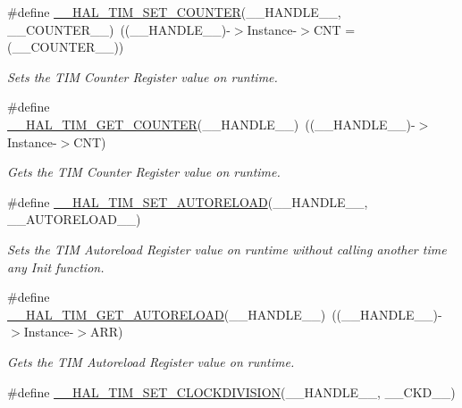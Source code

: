 \begin{DoxyCompactItemize}
\#define \hyperlink{group___t_i_m___exported___macros_ga9746ac75e4cd25cec1a9ebac8cb82b97}{\-\_\-\-\_\-\-H\-A\-L\-\_\-\-T\-I\-M\-\_\-\-S\-E\-T\-\_\-\-C\-O\-U\-N\-T\-E\-R}(\-\_\-\-\_\-\-H\-A\-N\-D\-L\-E\-\_\-\-\_\-, \-\_\-\-\_\-\-C\-O\-U\-N\-T\-E\-R\-\_\-\-\_\-)~((\-\_\-\-\_\-\-H\-A\-N\-D\-L\-E\-\_\-\-\_\-)-\/$>$Instance-\/$>$C\-N\-T = (\-\_\-\-\_\-\-C\-O\-U\-N\-T\-E\-R\-\_\-\-\_\-))
\begin{DoxyCompactList}\small\item\em Sets the T\-I\-M Counter Register value on runtime. \end{DoxyCompactList}\item 
\#define \hyperlink{group___t_i_m___exported___macros_gaf1af08014b9d06efbbb091d58d47c8ba}{\-\_\-\-\_\-\-H\-A\-L\-\_\-\-T\-I\-M\-\_\-\-G\-E\-T\-\_\-\-C\-O\-U\-N\-T\-E\-R}(\-\_\-\-\_\-\-H\-A\-N\-D\-L\-E\-\_\-\-\_\-)~((\-\_\-\-\_\-\-H\-A\-N\-D\-L\-E\-\_\-\-\_\-)-\/$>$Instance-\/$>$C\-N\-T)
\begin{DoxyCompactList}\small\item\em Gets the T\-I\-M Counter Register value on runtime. \end{DoxyCompactList}\item 
\#define \hyperlink{group___t_i_m___exported___macros_ga1e6300cab1e34ecaaf490dc7d4812d69}{\-\_\-\-\_\-\-H\-A\-L\-\_\-\-T\-I\-M\-\_\-\-S\-E\-T\-\_\-\-A\-U\-T\-O\-R\-E\-L\-O\-A\-D}(\-\_\-\-\_\-\-H\-A\-N\-D\-L\-E\-\_\-\-\_\-, \-\_\-\-\_\-\-A\-U\-T\-O\-R\-E\-L\-O\-A\-D\-\_\-\-\_\-)
\begin{DoxyCompactList}\small\item\em Sets the T\-I\-M Autoreload Register value on runtime without calling another time any Init function. \end{DoxyCompactList}\item 
\#define \hyperlink{group___t_i_m___exported___macros_gaa7a5c7645695bad15bacd402513a028a}{\-\_\-\-\_\-\-H\-A\-L\-\_\-\-T\-I\-M\-\_\-\-G\-E\-T\-\_\-\-A\-U\-T\-O\-R\-E\-L\-O\-A\-D}(\-\_\-\-\_\-\-H\-A\-N\-D\-L\-E\-\_\-\-\_\-)~((\-\_\-\-\_\-\-H\-A\-N\-D\-L\-E\-\_\-\-\_\-)-\/$>$Instance-\/$>$A\-R\-R)
\begin{DoxyCompactList}\small\item\em Gets the T\-I\-M Autoreload Register value on runtime. \end{DoxyCompactList}\item 
\#define \hyperlink{group___t_i_m___exported___macros_ga8aa84d77c670890408092630f9b2bdc4}{\-\_\-\-\_\-\-H\-A\-L\-\_\-\-T\-I\-M\-\_\-\-S\-E\-T\-\_\-\-C\-L\-O\-C\-K\-D\-I\-V\-I\-S\-I\-O\-N}(\-\_\-\-\_\-\-H\-A\-N\-D\-L\-E\-\_\-\-\_\-, \-\_\-\-\_\-\-C\-K\-D\-\_\-\-\_\-)

\end{DoxyCompactItemize}
